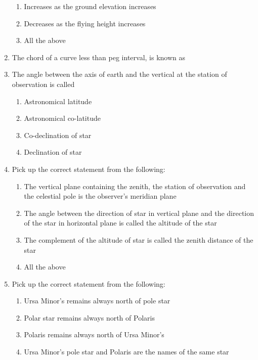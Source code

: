 \documentclass[11pt,a4paper]{article}
\begin{document}
\begin{enumerate}
\begin{enumerate}[label=\Alph*.]
\item{Increases as the ground elevation increases}
\item{Decreases as the flying height increases}
\item{All the above}
\end{enumerate}
\item{The chord of a curve less than peg interval, is known as}
\\
\item{The angle between the axis of earth and the vertical at the station of observation is called}
\begin{enumerate}[label=\Alph*.]
\item{Astronomical latitude}
\item{Astronomical co-latitude}
\item{Co-declination of star}
\item{Declination of star}
\end{enumerate}
\item{Pick up the correct statement from the following:}
\begin{enumerate}[label=\Alph*.]
\item{The vertical plane containing the zenith, the station of observation and the celestial pole is the observer's meridian plane}
\item{The angle between the direction of star in vertical plane and the direction of the star in horizontal plane is called the altitude of the star}
\item{The complement of the altitude of star is called the zenith distance of the star}
\item{All the above}
\end{enumerate}
\item{Pick up the correct statement from the following:}
\begin{enumerate}[label=\Alph*.]
\item{Ursa Minor's remains always north of pole star}
\item{Polar star remains always north of Polaris}
\item{Polaris remains always north of Ursa Minor's}
\item{Ursa Minor's pole star and Polaris are the names of the same star}

\end{enumerate}
\end{enumerate}
\end{document}
